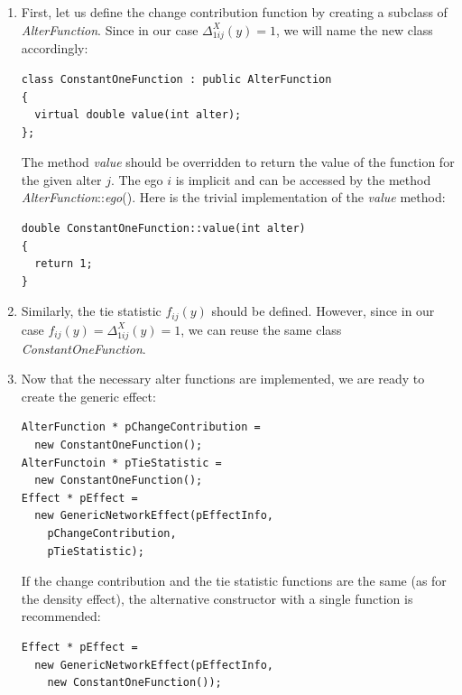 \documentclass[12pt]{article}
\renewcommand{\=}{\,=\,}
\newcommand{\+}{\,+\,}
\newcommand{\nnm}[1]{\textsf{\small\textit{#1}}}
\begin{document}
\begin{enumerate}
\item First, let us define the change contribution function by creating a subclass of \nnm{AlterFunction}. Since in our
case $\Delta_{1ij}^X(y)=1$, we will name the new class accordingly:
\begin{verbatim}
class ConstantOneFunction : public AlterFunction
{
  virtual double value(int alter);
};
\end{verbatim}
The method \nnm{value} should be overridden to return the value of the function for the given alter $j$. The ego $i$ is
implicit and can be accessed by the method \nnm{AlterFunction}::\nnm{ego}(). Here is the trivial implementation of
the \nnm{value} method:
\begin{verbatim}
double ConstantOneFunction::value(int alter)
{
  return 1;
}
\end{verbatim}

\item Similarly, the tie statistic $f_{ij}(y)$ should be defined. However, since in our case
$f_{ij}(y)=\Delta_{1ij}^X(y)=1$, we can reuse the same class \nnm{ConstantOneFunction}.

\item Now that the necessary alter functions are implemented, we are ready to create the generic effect:
\begin{verbatim}
AlterFunction * pChangeContribution =
  new ConstantOneFunction();
AlterFunctoin * pTieStatistic =
  new ConstantOneFunction();
Effect * pEffect =
  new GenericNetworkEffect(pEffectInfo,
    pChangeContribution,
    pTieStatistic);
\end{verbatim}
If the change contribution and the tie statistic functions are the same (as for the density effect),
the alternative constructor with a single function is recommended:
\begin{verbatim}
Effect * pEffect =
  new GenericNetworkEffect(pEffectInfo,
    new ConstantOneFunction());
\end{verbatim}
\end{enumerate}
\end{document}
